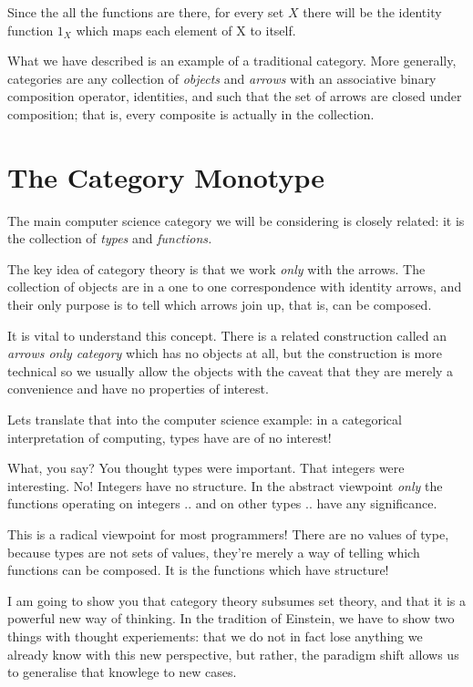 \documentclass[oneside]{book}
\theoremstyle{plain}
\theoremstyle{definition}
\theoremstyle{plain}
\begin{document}
Since the all the functions are there, for every set $X$ there will be
the identity function $1_X$ which maps each element of X to itself.

What we have described is an example of a traditional category.
More generally, categories are any collection of {\em objects}
and {\em arrows} with an associative binary composition
operator, identities, and such that the set of arrows are
closed under composition; that is, every composite is actually
in the collection.

\section{The Category {\bf Monotype}}
The main computer science category we will be considering is closely
related: it is the collection of {\em types} and {\em functions.}

The key idea of category theory is that we work {\em only} with
the arrows. The collection of objects are in a one to one
correspondence with identity arrows, and their only purpose is
to tell which arrows join up, that is, can be composed.

It is vital to understand this concept. There is a related
construction called an {\em arrows only category} which has
no objects at all, but the construction is more technical
so we usually allow the objects with the caveat that they
are merely a convenience and have no properties of interest.

Lets translate that into the computer science example:
in a categorical interpretation of computing, types have
are of no interest!

What, you say? You thought types were important. That
integers were interesting. No! Integers have no structure.
In the abstract viewpoint {\em only} the functions operating
on integers .. and on other types .. have any significance.

This is a radical viewpoint for most programmers! There are
no values of type, because types are not sets of values,
they're merely a way of telling which functions can be
composed. It is the functions which have structure!

I am going to show you that category theory subsumes set theory,
and that it is a powerful new way of thinking. In the tradition
of Einstein, we have to show two things with thought experiements:
that we do not in fact lose anything we already know with this
new perspective, but rather, the paradigm shift allows us to generalise
that knowlege to new cases.
\end{document}
